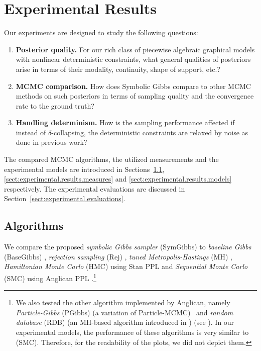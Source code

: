 \documentclass[]{article}
\begin{document}
\section{Experimental Results}
\label{sect:experimental.results}

Our experiments are designed to study the 
following questions:
\vspace{-2mm}
\begin{enumerate}[label=(\alph*)]
\item {\bf Posterior quality.} For our rich class of piecewise algebraic graphical models with nonlinear deterministic constraints, what general qualities of posteriors arise in terms of their modality, continuity, shape of support, etc.?
\item {\bf MCMC comparison.} How does Symbolic Gibbs compare to other MCMC methods on such posteriors in terms of sampling quality and the convergence rate to the ground truth?
\item {\bf Handling determinism.} How is the sampling performance affected if instead of $\delta$-collapsing, the deterministic constraints are relaxed by noise as done in previous work? 
\end{enumerate}
\vspace{-2mm}
The compared MCMC algorithms, 
the utilized measurements
and the experimental models  
are introduced in 
Sections~\ref{sect:experimental.results.algorithms},
\ref{sect:experimental.results.measures} 
and \ref{sect:experimental.results.models}
respectively.
The experimental evaluations are discussed in 
Section~\ref{sect:experimental.evaluations}.



\subsection{Algorithms} 
\label{sect:experimental.results.algorithms}
We compare the proposed \emph{symbolic Gibbs sampler} (SymGibbs) to
\emph{baseline Gibbs} (BaseGibbs) \citep{pearl1987evidential},
\emph{rejection sampling} (Rej) \citep{hammersley1964monte}, 
\emph{tuned Metropolis-Hastings} (MH) \citep{roberts1997weak}, 
\emph{Hamiltonian Monte Carlo} (HMC) using Stan PPL \citep{stan-manual:2014}
and \emph{Sequential Monte Carlo} (SMC) using Anglican PPL \citep{wood2014new}.\footnote{
We also tested the other algorithm implemented by Anglican, namely 
\emph{Particle-Gibbs} (PGibbs) (a variation of Particle-MCMC\citep{andrieu2010particle}) \
and \emph{random database} (RDB) (an MH-based algorithm introduced in \citep{wingate2011lightweight}) (see \cite{wood2014new}).
In our experimental models, the performance of these algorithms is very similar to (SMC).
Therefore, for the readability of the plots, we did not depict them.
}
\end{document}
